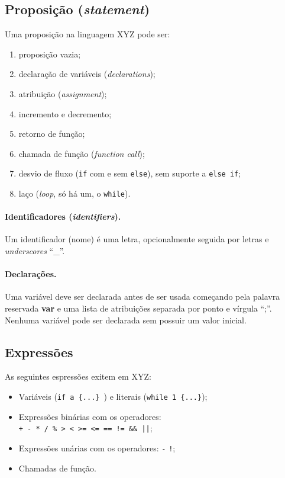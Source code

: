 \documentclass{article}
\def\lang{{\sc XYZ}}
\begin{document}
\subsection*{Proposição ({\it statement})}

Uma proposição na linguagem \lang{} pode ser:

\begin{enumerate}
\item proposição vazia;
\item declaração de variáveis ({\it declarations});
\item atribuição ({\it assignment});
\item incremento e decremento;
\item retorno de função;
\item chamada de função ({\it function call});
\item desvio de fluxo ({\tt if} com e sem {\tt else}), 
	sem suporte a {\tt else if};
\item laço ({\it loop}, só há um, o {\tt while}).
\end{enumerate}

\paragraph{Identificadores ({\it identifiers}).}
Um identificador (nome) é uma letra, opcionalmente seguida
por letras e {\it underscores} ``\_''.

\paragraph{Declarações.}
Uma variável deve ser declarada antes de ser usada começando
pela palavra reservada {\bf var} e uma lista de atribuições 
separada por ponto e vírgula ``;''. Nenhuma variável pode ser 
declarada sem possuir um valor inicial.

\subsection*{Expressões}
As seguintes espressões exitem em \lang:

\begin{itemize}
\item Variáveis ({\tt if a \{...\} }) e literais 
({\tt while 1 \{...\}});
\item Expressões binárias com os operadores: \\
{\tt + - * / \% > < >= <= == != \&\& ||};
\item Expressões unárias com os operadores:
	{\tt -} {\tt !};
\item Chamadas de função.
\end{itemize}
\end{document}
